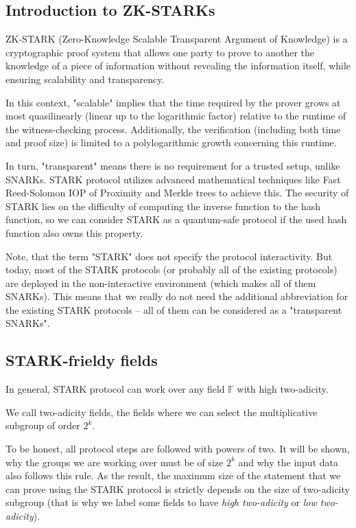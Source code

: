 \documentclass[../lecture-notes.tex]{subfiles}
\begin{document}
\subsection{Introduction to ZK-STARKs}

ZK-STARK (Zero-Knowledge Scalable Transparent Argument of Knowledge) is a cryptographic proof system that allows one party to prove to another the knowledge of a piece of information without revealing the information itself, while ensuring scalability and transparency. 

In this context, "scalable" implies that the time required by the prover grows at most quasilinearly (linear up to the logarithmic factor) relative to the runtime of the witness-checking process. Additionally, the verification (including both time and proof size) is limited to a polylogarithmic growth concerning this runtime.

In turn, "transparent" means there is no requirement for a trusted setup, unlike SNARKs. STARK protocol utilizes advanced mathematical techniques like Fast Reed-Solomon IOP of Proximity and Merkle trees to achieve this. The security of STARK lies on the difficulty of computing the inverse function to the hash function, so we can consider STARK as a quantum-safe protocol if the used hash function also owns this property.

Note, that the term "STARK" does not specify the protocol interactivity. But today, most of the STARK protocols (or probably all of the existing protocols) are deployed in the non-interactive environment (which makes all of them SNARKs). This means that we really do not need the additional abbreviation for the existing STARK protocols -- all of them can be considered as a "transparent SNARKs".

\subsection{STARK-frieldy fields}
In general, STARK protocol can work over any field $\mathbb{F}$ with high two-adicity.

\begin{definition}
    We call two-adicity fields, the fields where we can select the multiplicative subgroup of order $2^k$.
\end{definition}

To be honest, all protocol steps are followed with powers of two. It will be shown, why the groups we are working over must be of size $2^k$ and why the input data also follows this rule. As the result, the maximum size of the statement that we can prove using the STARK protocol is strictly depends on the size of two-adicity subgroup (that is why we label some fields to have \textit{high two-adicity} or \textit{low two-adicity}).
\end{document}
